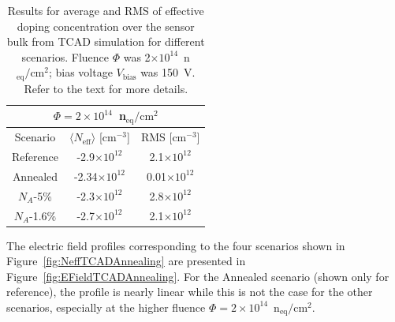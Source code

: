 \begin{table}[htbp]
   \centering
   \begin{tabular}{ccc} %
      \hline
            \multicolumn{3}{c}{$\Phi=2\times10^{14}$~n$_\text{eq}/\text{cm}^{2}$  } \\
      \hline %
        Scenario  & $\langle N_\text{eff}\rangle$ [cm$^{-3}$] & RMS [cm$^{-3}$] \\
      \hline
      \hline
         Reference &  -2.9$\times10^{12}$ & 2.1$\times10^{12}$  \\
 Annealed   & -2.34$\times10^{12}$ & 0.01$\times10^{12}$ \\
 $N_A$-5\% &  -2.3$\times10^{12}$ & 2.8$\times10^{12}$  \\
 $N_A$-1.6\% &  -2.7$\times10^{12}$ & 2.1$\times10^{12}$  \\
                   \bottomrule
   \end{tabular}
   \caption{\label{tab:TCADNeffHamburg2}Results for average and RMS of effective doping concentration over the sensor bulk from TCAD simulation for different scenarios. 
Fluence $\Phi$ was 2$\times10^{14}$~n$_\text{eq}/\text{cm}^{2}$; bias voltage $V_\text{bias}$ 
was 150~V.  Refer to the text for more details.}
\end{table}

The electric field profiles corresponding to the four scenarios shown in Figure~\ref{fig:NeffTCADAnnealing} are presented in Figure~\ref{fig:EFieldTCADAnnealing}.   For the Annealed scenario (shown only for reference), the profile is nearly linear while this is not the case for the other scenarios, especially at the higher fluence $\Phi=2\times10^{14}$~n$_\text{eq}/\text{cm}^{2}$.  


